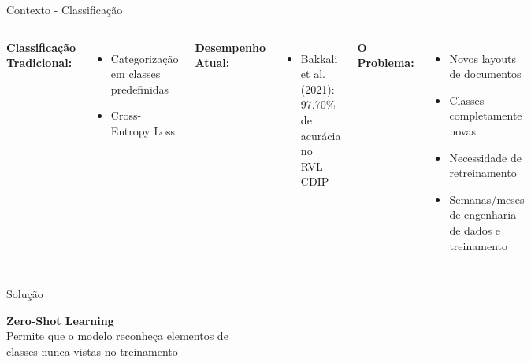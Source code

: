 

\begin{frame}{Contexto - Classificação}
\begin{columns}
\textbf{Classificação Tradicional:}
\begin{itemize}
    \item Categorização em classes predefinidas
    \item Cross-Entropy Loss
\end{itemize}

\textbf{Desempenho Atual:}
\begin{itemize}
    \item Bakkali et al. (2021): 97.70\% de acurácia no RVL-CDIP
\end{itemize}

\pause
\textbf{O Problema:}
\begin{itemize}
    \item Novos layouts de documentos
    \item Classes completamente novas
    \item Necessidade de retreinamento
    \item Semanas/meses de engenharia de dados e treinamento
\end{itemize}

\end{columns}
\end{frame}

\begin{frame}{Solução}
    \begin{center}
        {\Huge \textbf{Zero-Shot Learning}}\\ \vspace{0.5cm}
        Permite que o modelo reconheça elementos de\\ classes nunca vistas no treinamento
    \end{center}
\end{frame}

